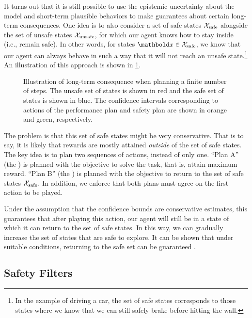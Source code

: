 It turns out that it is still possible to use the epistemic uncertainty about the model and short-term plausible behaviors to make guarantees about certain long-term consequences.
One idea is to also consider a set of safe states $\mathcal{X}_\mathrm{safe}$ alongside the set of unsafe states $\mathcal{X}_\mathrm{unsafe}$, for which our agent knows how to stay inside (i.e., remain safe).
In other words, for states $\vx \in \spX_\mathrm{safe}$, we know that our agent can always behave in such a way that it will not reach an unsafe state.\footnote{In the example of driving a car, the set of safe states corresponds to those states where we know that we can still safely brake before hitting the wall.}
An illustration of this approach is shown in \cref{fig:safe_learning_based_mpc}.

\begin{figure}
  \caption{Illustration of long-term consequence when planning a finite number of steps.
  The unsafe set of states is shown in red and the safe set of states is shown in blue.
  The confidence intervals corresponding to actions of the performance plan and safety plan are shown in orange and green, respectively.}\label{fig:safe_learning_based_mpc}
\end{figure}

The problem is that this set of safe states might be very conservative.
That is to say, it is likely that rewards are mostly attained \emph{outside} of the set of safe states.
The key idea is to plan two sequences of actions, instead of only one.
``Plan A'' (the ) is planned with the objective to solve the task, that is, attain maximum reward.
``Plan B'' (the ) is planned with the objective to return to the set of safe states $\mathcal{X}_\mathrm{safe}$.
In addition, we enforce that both plans must agree on the first action to be played.

Under the assumption that the confidence bounds are conservative estimates, this guarantees that after playing this action, our agent will still be in a state of which it can return to the set of safe states.
In this way, we can gradually increase the set of states that are safe to explore.
It can be shown that under suitable conditions, returning to the safe set can be guaranteed \citep{koller2018learning}.

\subsection{Safety Filters}

